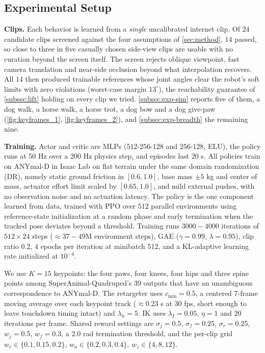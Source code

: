 \documentclass[letterpaper, 10 pt, conference]{ieeeconf}
\begin{document}
\subsection{Experimental Setup}\label{subsec:exp-setup}
\noindent
\textbf{Clips.} Each behavior is learned from a \textit{single} uncalibrated internet clip. Of $24$ candidate clips screened against the four assumptions of \autoref{sec:method}, $14$ passed, so close to three in five casually chosen side-view clips are usable with no curation beyond the screen itself. The screen rejects oblique viewpoint, fast camera translation and near-side occlusion beyond what interpolation recovers.
All $14$ then produced trainable references whose joint angles clear the robot's soft limits with zero violations (worst-case margin $13^\circ$), the reachability guarantee of \autoref{subsec:lift} holding on every clip we tried.
\autoref{subsec:exp-sim} reports five of them, a dog walk, a horse walk, a horse trot, a dog bow and a dog give-paw (\autoref{fig:keyframes_1}, \autoref{fig:keyframes_2}), and \autoref{subsec:exp-breadth} the remaining nine.
 
\textbf{Training.} Actor and critic are MLPs ($512$-$256$-$128$ and $256$-$128$, ELU), the policy runs at $50$ Hz over a $200$ Hz physics step, and episodes last $20$ s. All policies train on ANYmal-D in Isaac Lab \cite{mittal2025isaac} on flat terrain under the same domain randomization (DR), namely static ground friction in $[0.6,1.0]$, base mass $\pm5$ kg and center of mass, actuator effort limit scaled by $[0.65,1.0]$, and mild external pushes, with no observation noise and no actuation latency. The policy is the one component learned from data, trained with PPO \cite{schulman2017ppo} over $512$ parallel environments \cite{rudin2022learning} using reference-state initialization at a random phase and early termination when the tracked pose deviates beyond a threshold. Training runs $3000-4000$ iterations of $512\times24$ steps (${\approx}37-49$M environment steps), GAE ($\gamma{=}0.99$, $\lambda{=}0.95$), clip ratio $0.2$, $4$ epochs per iteration at minibatch $512$, and a KL-adaptive learning rate initialized at $10^{-4}$. 

We use $K{=}15$ keypoints: the four paws, four knees, four hips and three spine points among SuperAnimal-Quadruped's $39$ outputs that have an unambiguous correspondence to ANYmal-D. The retargeter uses $c_{\min}{=}0.5$, a centered $7$-frame moving average over each keypoint track (${\approx}0.23$ s at $30$ fps, short enough to leave touchdown timing intact) and $\lambda_h{=}5$. IK uses $\lambda_I{=}0.05$, $\eta{=}1$ and $20$ iterations per frame. Shared reward settings are $\sigma_j{=}0.5$, $\sigma_f{=}0.25$, $\sigma_r{=}0.25$, $w_j{=}0.5$, $w_f{=}0.3$, a $2.0$ rad termination threshold, and the per-clip grid $w_r\in\{0.1,0.15,0.2\}$, $w_a\in\{0.2,0.3,0.4\}$, $w_z\in\{4,8,12\}$.
\end{document}
